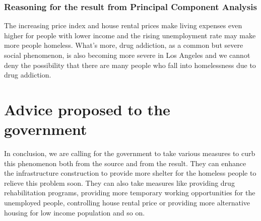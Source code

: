 \documentclass[]{article}
\begin{document}
\hypertarget{reasoning-for-the-result-from-principal-component-analysis}{%
\subsubsection{Reasoning for the result from Principal Component
Analysis}\label{reasoning-for-the-result-from-principal-component-analysis}}

The increasing price index and house rental prices make living expenses
even higher for people with lower income and the rising unemployment
rate may make more people homeless. What's more, drug addiction, as a
common but severe social phenomenon, is also becoming more severe in Los
Angeles and we cannot deny the possibility that there are many people
who fall into homelessness due to drug addiction.

\hypertarget{advice-proposed-to-the-government}{%
\section{Advice proposed to the
government}\label{advice-proposed-to-the-government}}

In conclusion, we are calling for the government to take various
measures to curb this phenomenon both from the source and from the
result. They can enhance the infrastructure construction to provide more
shelter for the homeless people to relieve this problem soon. They can
also take measures like providing drug rehabilitation programs,
providing more temporary working opportunities for the unemployed
people, controlling house rental price or providing more alternative
housing for low income population and so on.
\end{document}
